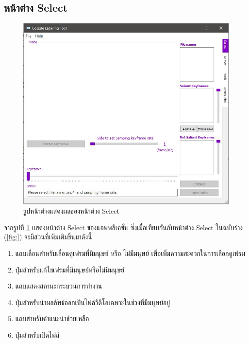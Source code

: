 \subsection*{หน้าต่าง Select}
\begin{figure}[!ht]
  \centering
    \includegraphics[scale=0.65]{chapter4/images/Final_ui/Select.jpg}
    \caption{รูปหน้าต่างแสดงผลของหน้าต่าง Select}
    \label{fig:final_select}
\end{figure}
จากรูปที่ \ref{fig:final_select} แสดงหน้าต่าง Select ของแอพพลิเคชั่น ซึ่งเมื่อเทียบกันกับหน้าต่าง Select ในฉบับร่าง (\ref{fig:}) จะมีส่วนที่เพิ่มเติมขึ้นมาดังนี้
\begin{enumerate}
	\item แถบเลื่อนสำหรับเลื่อนดูเฟรมที่มีมนุษย์ หรือ ไม่มีมนุษย์ เพื่อเพิ่มความสะดวกในการเลือกดูเฟรม
	\item ปุ่มสำหรับแก้ไขเฟรมที่มีมนุษย์หรือไม่มีมนุษย์
	\item แถบแสดงสถานะกระบวนการทำงาน
	\item ปุ่มสำหรับนำผลลัพธ์ออกเป็นไฟล์วิดิโอเฉพาะในช่วงที่มีมนุษย์อยู่
	\item แถบสำหรับคำแนะนำช่วยเหลือ
	\item ปุ่มสำหรับเปิดไฟล์
\end{enumerate}		

\clearpage
